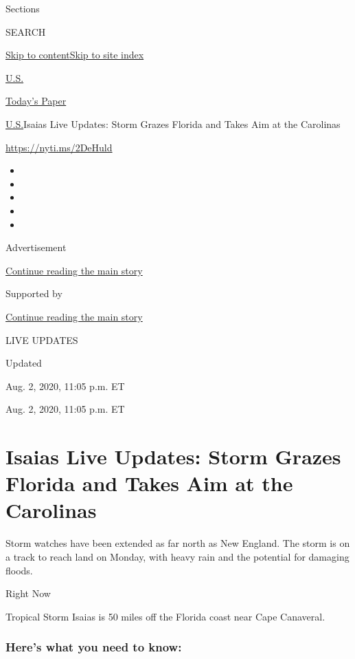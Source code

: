 Sections

SEARCH

\protect\hyperlink{site-content}{Skip to
content}\protect\hyperlink{site-index}{Skip to site index}

\href{https://www.nytimes3xbfgragh.onion/section/us}{U.S.}

\href{https://myaccount.nytimes3xbfgragh.onion/auth/login?response_type=cookie\&client_id=vi}{}

\href{https://www.nytimes3xbfgragh.onion/section/todayspaper}{Today's
Paper}

\href{/section/us}{U.S.}\textbar{}Isaias Live Updates: Storm Grazes
Florida and Takes Aim at the Carolinas

\url{https://nyti.ms/2DeHuld}

\begin{itemize}
\item
\item
\item
\item
\item
\end{itemize}

Advertisement

\protect\hyperlink{after-top}{Continue reading the main story}

Supported by

\protect\hyperlink{after-sponsor}{Continue reading the main story}

LIVE UPDATES

Updated~

Aug. 2, 2020, 11:05 p.m. ET

Aug. 2, 2020, 11:05 p.m. ET

\hypertarget{isaias-live-updates-storm-grazes-florida-and-takes-aim-at-the-carolinas}{%
\section{Isaias Live Updates: Storm Grazes Florida and Takes Aim at the
Carolinas}\label{isaias-live-updates-storm-grazes-florida-and-takes-aim-at-the-carolinas}}

Storm watches have been extended as far north as New England. The storm
is on a track to reach land on Monday, with heavy rain and the potential
for damaging floods.

Right Now

Tropical Storm Isaias is 50 miles off the Florida coast near Cape
Canaveral.

\hypertarget{heres-what-you-need-to-know}{%
\subsubsection{Here's what you need to
know:}\label{heres-what-you-need-to-know}}

